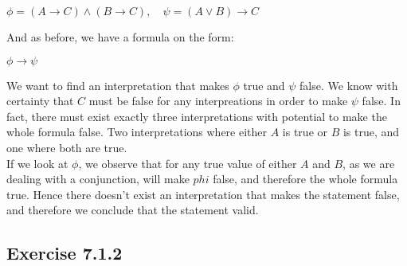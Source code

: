 \documentclass{article}
\newcommand{\cent}[1]{\begin{center}#1\end{center}}
\newcommand{\Exercise}[1]{\subsection{Exercise #1}}
\begin{document}
\begin{enumerate}
 		\cent{$\phi = (A \to C) \wedge (B \to C), \quad \psi = (A \vee B) \to C $}
 		
 		And as before, we have a formula on the form:
 		
 		\cent{$\phi \to \psi$}
 		
 		We want to find an interpretation that makes $\phi$ true and $\psi$ false. We know with certainty that $C$ must be false for any interpreations in order to make $\psi$ false. In fact, there must exist exactly three interpretations with potential to make the whole formula false. Two interpretations where either $A$ is true or $B$ is true, and one where both are true.\\
 		
 		If we look at $\phi$, we observe that for any true value of either $A$ and $B$, as we are dealing with a conjunction, will make $phi$ false, and therefore the whole formula true. Hence there doesn't exist an interpretation that makes the statement false, and therefore we conclude that the statement valid.
 	\end{enumerate}
 	
 	\Exercise{7.1.2}
 	
\end{document}
